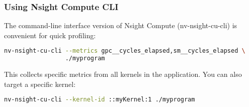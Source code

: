 \subsubsection{Using Nsight Compute CLI}

The command-line interface version of Nsight Compute (nv-nsight-cu-cli) is convenient for quick profiling:

\begin{lstlisting}[language=bash]
nv-nsight-cu-cli --metrics gpc__cycles_elapsed,sm__cycles_elapsed \
                 ./myprogram
\end{lstlisting}

This collects specific metrics from all kernels in the application. You can also target a specific kernel:

\begin{lstlisting}[language=bash]
nv-nsight-cu-cli --kernel-id ::myKernel:1 ./myprogram
\end{lstlisting}

